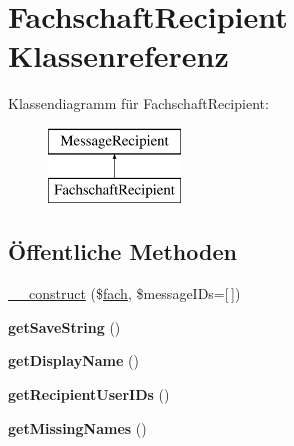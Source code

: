 \hypertarget{class_fachschaft_recipient}{}\section{Fachschaft\+Recipient Klassenreferenz}
\label{class_fachschaft_recipient}
Klassendiagramm für Fachschaft\+Recipient\+:\begin{figure}[H]
\begin{center}
\leavevmode
\includegraphics[height=2.000000cm]{class_fachschaft_recipient}
\end{center}
\end{figure}
\subsection*{Öffentliche Methoden}
\begin{DoxyCompactItemize}
\item 
\mbox{\hyperlink{class_fachschaft_recipient_a0c85915239e1f2f9b0fcc21a1087eed2}{\+\_\+\+\_\+construct}} (\$\mbox{\hyperlink{classfach}{fach}}, \$message\+I\+Ds=\mbox{[}$\,$\mbox{]})
\item 
\mbox{\label{class_fachschaft_recipient_ae0e4b987c928ed4ca6940c227a9ce75b}} 
{\bfseries get\+Save\+String} ()
\item 
\mbox{\label{class_fachschaft_recipient_abae209ef92fd88127f9b3c9d40dd810b}} 
{\bfseries get\+Display\+Name} ()
\item 
\mbox{\label{class_fachschaft_recipient_a89b5612c123cac9e62271c0ccd014a19}} 
{\bfseries get\+Recipient\+User\+I\+Ds} ()
\item 
\mbox{\label{class_fachschaft_recipient_aa1977af4cdb5c80bc5b01d0148ee5ed1}} 
{\bfseries get\+Missing\+Names} ()
\end{DoxyCompactItemize}
